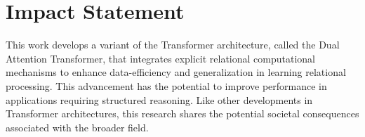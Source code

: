 \section*{Impact Statement}

This work develops a variant of the Transformer architecture, called the Dual Attention Transformer, that integrates explicit relational computational mechanisms to enhance data-efficiency and generalization in learning relational processing. This advancement has the potential to improve performance in applications requiring structured reasoning. Like other developments in Transformer architectures, this research shares the potential societal consequences associated with the broader field.

